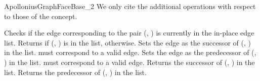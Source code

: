 \begin{ccRefConcept}{ApolloniusGraphFaceBase_2}
We only cite the additional operations with respect to those of the
 concept.

%
%
{Checks if the edge corresponding to the pair (, )
is currently in the in-place edge list. Returns  if
(, ) is in the list,  otherwise.}
\ccGlue
{}
{Sets the edge  as the successor of
(, ) in the list.
\ccPrecond {} must correspond to a valid edge.}
\ccGlue
{}
{Sets the edge  as the predecessor of
(, ) in the list.
\ccPrecond {} must correspond to a valid edge.}
\ccGlue
{}
{Returns the successor of (, ) in the list.}
\ccGlue
{}
{Returns the predecessor of (, ) in the list.}


\ccHasModels
{}


\ccSeeAlso
{}\\
\\
\\

\end{ccRefConcept}

